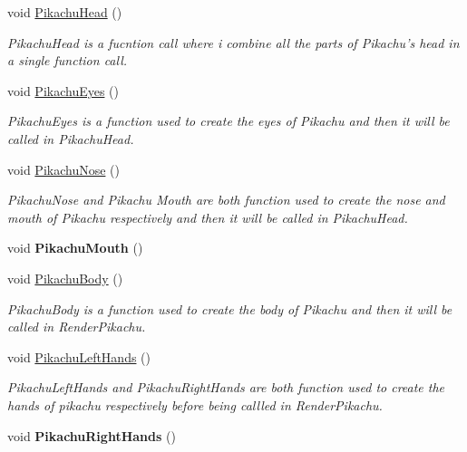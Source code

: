 \begin{DoxyCompactItemize}
\item 
void \hyperlink{class_scene_light_ad60deb62dc3a5570e8c9c4c809951df6}{Pikachu\+Head} ()
\begin{DoxyCompactList}\small\item\em Pikachu\+Head is a fucntion call where i combine all the parts of Pikachu's head in a single function call. \end{DoxyCompactList}\item 
void \hyperlink{class_scene_light_a6ed17a486082d6fa33480124e0c3c6fe}{Pikachu\+Eyes} ()
\begin{DoxyCompactList}\small\item\em Pikachu\+Eyes is a function used to create the eyes of Pikachu and then it will be called in Pikachu\+Head. \end{DoxyCompactList}\item 
void \hyperlink{class_scene_light_a2dac04dba19c6c12dfd1917395cf567b}{Pikachu\+Nose} ()
\begin{DoxyCompactList}\small\item\em Pikachu\+Nose and Pikachu Mouth are both function used to create the nose and mouth of Pikachu respectively and then it will be called in Pikachu\+Head. \end{DoxyCompactList}\item 
\hypertarget{class_scene_light_a21975d512f03405c6f4cc5ffb4e04300}{void {\bfseries Pikachu\+Mouth} ()}\label{class_scene_light_a21975d512f03405c6f4cc5ffb4e04300}

\item 
void \hyperlink{class_scene_light_a4b3aadf3c9ad220a1cd19e39480c7956}{Pikachu\+Body} ()
\begin{DoxyCompactList}\small\item\em Pikachu\+Body is a function used to create the body of Pikachu and then it will be called in Render\+Pikachu. \end{DoxyCompactList}\item 
void \hyperlink{class_scene_light_a3a0513d87de1bdc3a750b85524655bb9}{Pikachu\+Left\+Hands} ()
\begin{DoxyCompactList}\small\item\em Pikachu\+Left\+Hands and Pikachu\+Right\+Hands are both function used to create the hands of pikachu respectively before being callled in Render\+Pikachu. \end{DoxyCompactList}\item 
\hypertarget{class_scene_light_a82e9b15e5dfc4bd07ab1c73e1824cf04}{void {\bfseries Pikachu\+Right\+Hands} ()}\label{class_scene_light_a82e9b15e5dfc4bd07ab1c73e1824cf04}


\end{DoxyCompactItemize}
